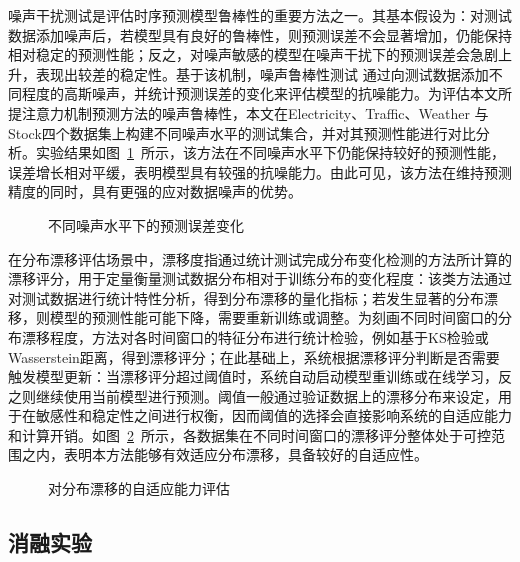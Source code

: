 噪声干扰测试是评估时序预测模型鲁棒性的重要方法之一。其基本假设为：对测试数据添加噪声后，若模型具有良好的鲁棒性，则预测误差不会显著增加，仍能保持相对稳定的预测性能；反之，对噪声敏感的模型在噪声干扰下的预测误差会急剧上升，表现出较差的稳定性。基于该机制，噪声鲁棒性测试
通过向测试数据添加不同程度的高斯噪声，并统计预测误差的变化来评估模型的抗噪能力。为评估本文所提注意力机制预测方法的噪声鲁棒性，本文在Electricity、Traffic、Weather 与 Stock四个数据集上构建不同噪声水平的测试集合，并对其预测性能进行对比分析。实验结果如图~\ref{fig:ch3-strip-entropy}~所示，该方法在不同噪声水平下仍能保持较好的预测性能，误差增长相对平缓，表明模型具有较强的抗噪能力。由此可见，该方法在维持预测精度的同时，具有更强的应对数据噪声的优势。

\begin{figure}[htbp]
\centering
{}%
\caption{不同噪声水平下的预测误差变化}
\label{fig:ch3-strip-entropy}
\end{figure}

在分布漂移评估场景中，漂移度指通过统计测试完成分布变化检测的方法所计算的漂移评分，用于定量衡量测试数据分布相对于训练分布的变化程度：该类方法通过对测试数据进行统计特性分析，得到分布漂移的量化指标；若发生显著的分布漂移，则模型的预测性能可能下降，需要重新训练或调整。为刻画不同时间窗口的分布漂移程度，方法对各时间窗口的特征分布进行统计检验，例如基于KS检验或Wasserstein距离，得到漂移评分；在此基础上，系统根据漂移评分判断是否需要触发模型更新：当漂移评分超过阈值时，系统自动启动模型重训练或在线学习，反之则继续使用当前模型进行预测。阈值一般通过验证数据上的漂移分布来设定，用于在敏感性和稳定性之间进行权衡，因而阈值的选择会直接影响系统的自适应能力和计算开销。如图~\ref{fig:ch3-nc-resist}~所示，各数据集在不同时间窗口的漂移评分整体处于可控范围之内，表明本方法能够有效适应分布漂移，具备较好的自适应性。

\begin{figure}[htbp]
\centering
\begin{minipage}{0.88\linewidth}
\centering
\setlength{\parskip}{0pt}%
%
\end{minipage}
\caption{对分布漂移的自适应能力评估}
\label{fig:ch3-nc-resist}
\end{figure}

\FloatBarrier
\subsection{消融实验}\label{ux6d88ux878dux5b9eux9a8c}

